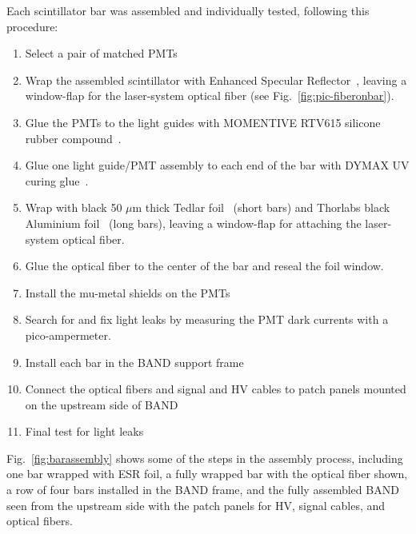 \documentclass[3p,twocolumn]{elsarticle}
\begin{document}
Each scintillator bar was assembled and individually tested, following this procedure:
\begin{enumerate}
\item Select a pair of matched PMTs
\item Wrap the assembled scintillator with Enhanced Specular Reflector~\cite{3MESR}, leaving a window-flap for the laser-system optical fiber (see Fig.~\ref{fig:pic-fiberonbar}).
\item Glue the PMTs to the light guides with MOMENTIVE RTV615 silicone rubber compound~\cite{softglue}.
\item Glue one light guide/PMT assembly to each end of the bar with DYMAX
  UV curing glue~\cite{uvglue}.
\item Wrap with black 50 $\mu$m thick Tedlar\textregistered{} foil~\cite{tedlarfoil} (short bars) and Thorlabs black Aluminium foil~\cite{thorlabsfoil} (long bars), leaving a
  window-flap for attaching the laser-system optical fiber.
\item Glue the optical fiber to the center of the bar and reseal the foil window.
\item Install the mu-metal shields on the PMTs 
\item Search for and fix light leaks by measuring the PMT dark currents with a pico-ampermeter.
\item Install each bar in the BAND support frame
\item Connect the optical fibers and signal and HV cables to patch panels mounted on the upstream side of BAND
\item Final test for light leaks
\end{enumerate}
Fig.~\ref{fig:barassembly} shows some of the steps in the assembly process,
including one bar wrapped with ESR foil, a fully wrapped bar with the
optical fiber shown, a row of four bars installed in the BAND frame,
and the fully assembled BAND seen from the upstream side with the
patch panels for HV, signal cables, and optical fibers.
\end{document}
